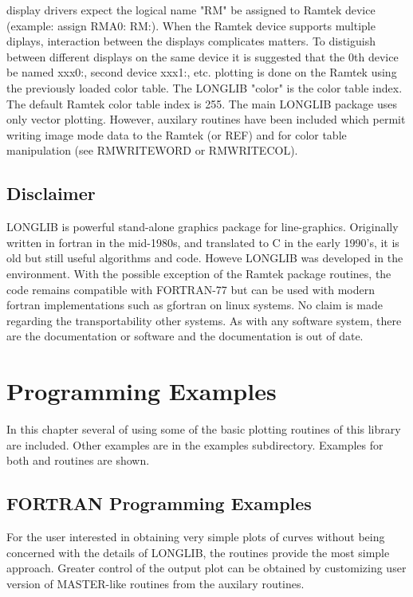 \documentclass[11pt]{report}
\begin{document}
 display drivers expect the logical name "RM" be assigned to Ramtek
device (example: assign RMA0: RM:).  When the Ramtek device supports
multiple diplays, interaction between the displays complicates
matters.  To distiguish between different displays on the same device
it is suggested that the 0th device be named xxx0:, second device
xxx1:, etc.  plotting is done on the Ramtek using the
previously loaded color table. The LONGLIB "color" is the color table
index.  The default Ramtek color table index is 255.  The main LONGLIB
package uses only vector plotting.  However, auxilary routines have
been included which permit writing image mode data to the Ramtek (or
REF) and for color table manipulation (see RMWRITEWORD or RMWRITECOL).


\section{Disclaimer}

LONGLIB is powerful stand-alone graphics package for line-graphics.
Originally written in fortran in the mid-1980s, and translated to C in
the early 1990's, it is old but still useful algorithms and
code. Howeve LONGLIB was developed in the   environment.
With the possible exception of the Ramtek package routines, the code
remains compatible with FORTRAN-77 but can be used with modern fortran
implementations such as gfortran on linux systems.  No claim is made
regarding the transportability other systems.  As with any software
system, there are the documentation or software and the documentation
is out of date.

\chapter{Programming Examples}

In this chapter several  of using some of the basic plotting
routines of this library are included.  Other examples are in the
examples subdirectory. 
Examples for both  and  routines are shown.

\section{FORTRAN Programming Examples}

For the user interested in obtaining very simple plots of curves
without being concerned with the details of LONGLIB, the 
routines provide the most simple approach.  Greater control of the
output plot can be obtained by customizing user version of MASTER-like
routines from the auxilary routines.
\end{document}
